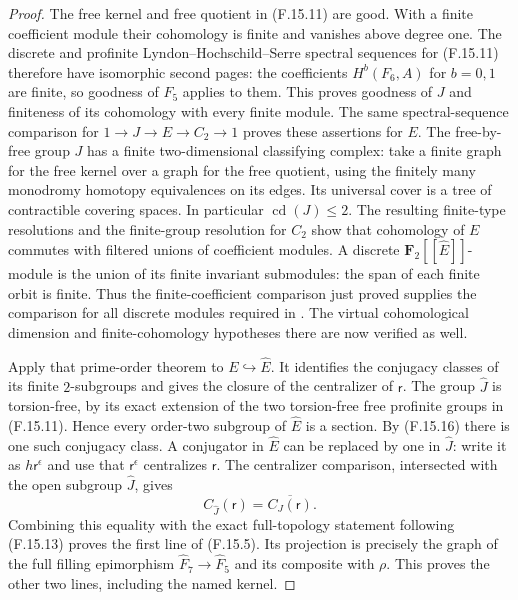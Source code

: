 \begin{proof}
The free kernel and free quotient in (F.15.11)
are good.  With a finite coefficient module their
cohomology is finite and vanishes above degree one.
The discrete and profinite
Lyndon--Hochschild--Serre spectral sequences for
(F.15.11) therefore have isomorphic second pages:
the coefficients $H^b(F_6,A)$ for $b=0,1$ are
finite, so goodness of $F_5$ applies to them.
This proves goodness of $J$ and finiteness of its
cohomology with every finite module.
The same spectral-sequence comparison for
$1\to J\to E\to C_2\to1$ proves these assertions
for $E$.
The free-by-free group $J$ has a finite
two-dimensional classifying complex: take a
finite graph for the free kernel over a graph
for the free quotient, using the finitely many
monodromy homotopy equivalences on its edges.
Its universal cover is a tree of contractible
covering spaces.  In particular
$\operatorname{cd}(J)\leq2$.
The resulting finite-type resolutions and the
finite-group resolution for $C_2$ show that
cohomology of $E$ commutes with filtered unions
of coefficient modules.  A discrete
$\mathbf F_2[\![\widehat E]\!]$-module is the
union of its finite invariant submodules:
the span of each finite orbit is finite.
Thus the finite-coefficient comparison just
proved supplies the comparison for all
discrete modules required in
\cite[Theorem A]{R-BZ}.
The virtual cohomological dimension and
finite-cohomology hypotheses there are now
verified as well.

Apply that prime-order theorem to
$E\hookrightarrow\widehat E$.
It identifies the conjugacy classes of its
finite $2$-subgroups and gives the closure
of the centralizer of $\mathsf r$.
The group $\widehat J$ is torsion-free, by
its exact extension of the two torsion-free
free profinite groups in (F.15.11).
Hence every order-two subgroup of $\widehat E$
is a section.  By (F.15.16) there is one such
conjugacy class.  A conjugator in $\widehat E$
can be replaced by one in $\widehat J$:
write it as $h\mathsf r^\epsilon$ and use
that $\mathsf r^\epsilon$ centralizes
$\mathsf r$.
The centralizer comparison, intersected with
the open subgroup $\widehat J$, gives
\[
 C_{\widehat J}(\mathsf r)
                  =\overline{C_J(\mathsf r)}.
                                                               \tag{F.15.17}
\]
Combining this equality with the exact
full-topology statement following (F.15.13)
proves the first line of (F.15.5).
Its projection is precisely the graph of
the full filling epimorphism
$\widehat F_7\to\widehat F_5$ and its
composite with $\rho$.  This proves the
other two lines, including the named kernel.


\end{proof}
